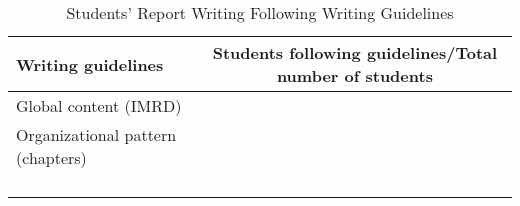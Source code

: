\begin{table*}[b]
\centering
\caption{Students' Report Writing Following Writing Guidelines}
\begin{tabular}{|l|c|}
 \hline
    \textbf{Writing guidelines}&\textbf{Students following guidelines/Total number of students}\\
 \hline
    Global content (IMRD)&\\
 \hline 
    Organizational pattern (chapters)&\\
 \hline
   & \\
 \hline 
   & \\
 \hline
    &\\
 \hline
   & \\
 \hline
\end{tabular}
\label{table:frequent_writing_considerations}
\end{table*}